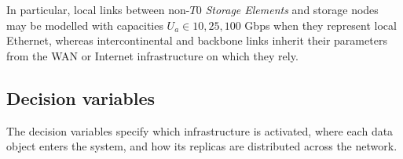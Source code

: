 \documentclass[a4paper,fleqn]{cas-dc}
\begin{document}
In particular, local links between non-\(T0\) \emph{Storage Elements} and storage nodes may be modelled with capacities \(U_a\in{10,25,100}\) Gbps when they represent local Ethernet, whereas intercontinental and backbone links inherit their parameters from the WAN or Internet infrastructure on which they rely.

\subsection{Decision variables}

The decision variables specify which infrastructure is activated, where each data object enters the system, and how its replicas are distributed across the network.
\end{document}
